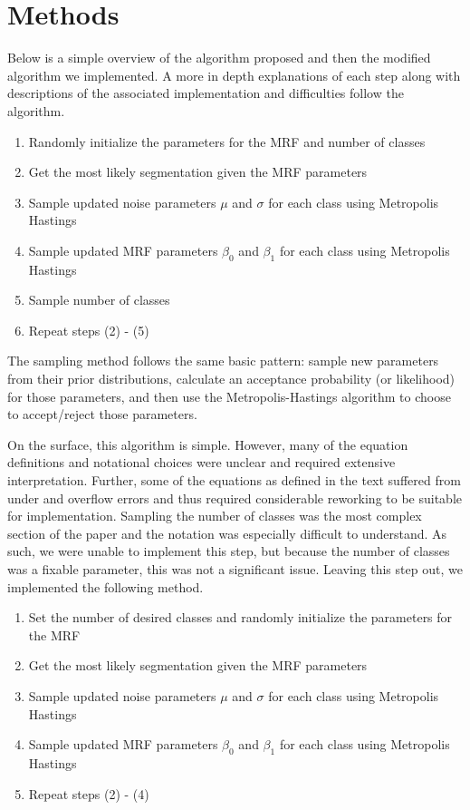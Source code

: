 \documentclass[11pt]{article}
\begin{document}
\section{Methods}
Below is a simple overview of the algorithm proposed and then the modified algorithm we implemented.
A more in depth explanations of each step along with descriptions of the associated implementation and difficulties follow the algorithm.

\begin{enumerate}
	\item Randomly initialize the parameters for the MRF and number of classes
	\item Get the most likely segmentation given the MRF parameters
	\item Sample updated noise parameters $\mu$ and $\sigma$ for each class using Metropolis Hastings
	\item Sample updated MRF parameters $\beta_0$ and $\beta_1$ for each class using Metropolis Hastings
	\item Sample number of classes
	\item Repeat steps (2) - (5)
\end{enumerate}
The sampling method follows the same basic pattern: sample new parameters from their prior distributions, calculate an acceptance probability (or likelihood) for those parameters, and then use the Metropolis-Hastings algorithm to choose to accept/reject those parameters.

On the surface, this algorithm is simple. However, many of the equation definitions and notational choices were unclear and required extensive interpretation.
Further, some of the equations as defined in the text suffered from under and overflow errors and thus required considerable reworking to be suitable for implementation.
Sampling the number of classes was the most complex section of the paper and the notation was especially difficult to understand.
As such, we were unable to implement this step, but because the number of classes was a fixable parameter, this was not a significant issue.
Leaving this step out, we implemented the following method.
\begin{enumerate}
	\item Set the number of desired classes and randomly initialize the parameters for the MRF
	\item Get the most likely segmentation given the MRF parameters
	\item Sample updated noise parameters $\mu$ and $\sigma$ for each class using Metropolis Hastings
	\item Sample updated MRF parameters $\beta_0$ and $\beta_1$ for each class using Metropolis Hastings
	\item Repeat steps (2) - (4)
\end{enumerate}
\end{document}
